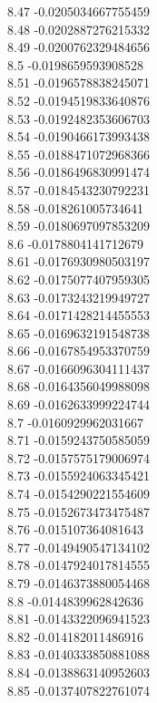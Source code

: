 {8.47	-0.0205034667755459\\
8.48	-0.0202887276215332\\
8.49	-0.0200762329484656\\
8.5	-0.0198659593908528\\
8.51	-0.0196578838245071\\
8.52	-0.0194519833640876\\
8.53	-0.0192482353606703\\
8.54	-0.0190466173993438\\
8.55	-0.0188471072968366\\
8.56	-0.0186496830991474\\
8.57	-0.0184543230792231\\
8.58	-0.018261005734641\\
8.59	-0.0180697097853209\\
8.6	-0.0178804141712679\\
8.61	-0.0176930980503197\\
8.62	-0.0175077407959305\\
8.63	-0.0173243219949727\\
8.64	-0.0171428214455553\\
8.65	-0.0169632191548738\\
8.66	-0.0167854953370759\\
8.67	-0.0166096304111437\\
8.68	-0.0164356049988098\\
8.69	-0.0162633999224744\\
8.7	-0.0160929962031667\\
8.71	-0.0159243750585059\\
8.72	-0.0157575179006974\\
8.73	-0.0155924063345421\\
8.74	-0.0154290221554609\\
8.75	-0.0152673473475487\\
8.76	-0.015107364081643\\
8.77	-0.0149490547134102\\
8.78	-0.0147924017814555\\
8.79	-0.0146373880054468\\
8.8	-0.0144839962842636\\
8.81	-0.0143322096941523\\
8.82	-0.014182011486916\\
8.83	-0.0140333850881088\\
8.84	-0.0138863140952603\\
8.85	-0.0137407822761074\\
}
